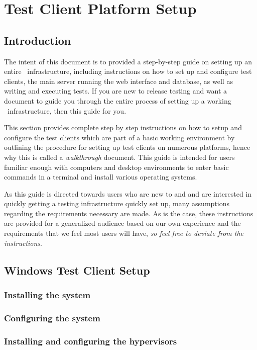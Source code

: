 \chapter{\cernvmreleasetesting Test Client Platform Setup}
\label{sct:testclientsetup}

\section{Introduction}
The intent of this document is to provided a step-by-step guide on setting up an entire \cernvmreleasetesting\ infrastructure, including instructions
on how to set up and configure test clients, the main server running the web interface and database, as well as writing and executing tests. If you are
new to release testing and want a document to guide you through the entire process of setting up a working \cernvmreleasetesting\ infrastructure,
then this guide for you.

This section provides complete step by step instructions on how to setup and configure the test clients which are part of a basic working
\releasetesting environment by outlining the procedure for setting up test clients on numerous platforms, hence why this is called a 
\emph{walkthrough} document. This guide is intended for users familiar enough with computers and desktop environments to enter basic commands
in a terminal and install various operating systems. 

As this guide is directed towards users who are new to \cernvmreleasetesting and \tapper and
are interested in quickly getting a \cernvm testing infrastructure quickly set up, many assumptions regarding the requirements necessary are made.
As is the case, these instructions are provided for a generalized audience based on our own experience and the requirements that we feel most users
will have, \emph{so feel free to deviate from the instructions}. 

\section{Windows Test Client Setup}
\subsection{Installing the system}
\subsection{Configuring the system}
\subsection{Installing and configuring the hypervisors}
